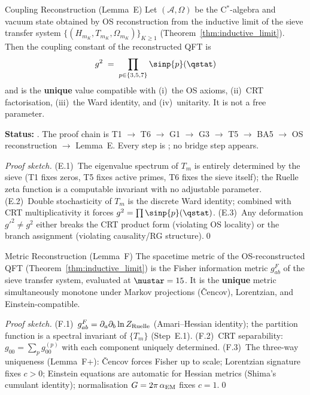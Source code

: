 \documentclass[12pt,a4paper]{article}
\begin{document}
\begin{thmbox}{Coupling Reconstruction (Lemma~E)}\mTHM
\label{thm:coupling_reconstruction}
Let $(\mathcal{A}, \Omega)$ be the C$^*$-algebra and vacuum state
obtained by OS reconstruction from the inductive limit of the sieve
transfer system $\{(H_{m_K}, T_{m_K}, \Omega_{m_K})\}_{K \geq 1}$
(Theorem~\ref{thm:inductive_limit}).  Then the coupling constant
of the reconstructed QFT is
\begin{equation}
  g^2 \;=\; \prod_{p \in \{3,5,7\}} \sinp{p}(\qstat)
  \label{eq:coupling_spectral}
\end{equation}
and is the \textbf{unique} value compatible with (i)~the OS axioms,
(ii)~CRT factorisation, (iii)~the Ward identity, and (iv)~unitarity.
It is not a free parameter.

\smallskip\noindent\textbf{Status:} \THMTAG.  The proof chain is
T1 $\to$ T6 $\to$ G1 $\to$ G3 $\to$ T5 $\to$ BA5 $\to$
OS reconstruction $\to$ Lemma~E.
Every step is \THMTAG; no bridge step appears.
\end{thmbox}

\noindent\textit{Proof sketch.}
(E.1)~The eigenvalue spectrum of $T_m$ is entirely determined by the
sieve (T1 fixes zeros, T5 fixes active primes, T6 fixes the sieve
itself); the Ruelle zeta function is a computable invariant with no
adjustable parameter.
(E.2)~Double stochasticity of $T_m$ is the discrete Ward identity;
combined with CRT multiplicativity it forces
$g^2 = \prod \sinp{p}(\qstat)$.
(E.3)~Any deformation $g'^2 \neq g^2$ either breaks the CRT product
form (violating OS locality) or the branch assignment (violating
causality/RG structure).\qed

\begin{thmbox}{Metric Reconstruction (Lemma~F)}\mTHM
\label{thm:metric_reconstruction}
The spacetime metric of the OS-reconstructed QFT
(Theorem~\ref{thm:inductive_limit}) is the Fisher information metric
$g^F_{ab}$ of the sieve transfer system, evaluated at $\mustar = 15$.
It is the \textbf{unique} metric simultaneously monotone under Markov
projections (\v{C}encov), Lorentzian, and Einstein-compatible.
\end{thmbox}

\noindent\textit{Proof sketch.}
(F.1)~$g^F_{ab} = \partial_a\partial_b \ln Z_{\rm Ruelle}$
(Amari--Hessian identity); the partition function is a spectral
invariant of $\{T_m\}$ (Step~E.1).
(F.2)~CRT separability:
$g_{00} = \sum_p g_{00}^{(p)}$ with each component uniquely determined.
(F.3)~The three-way uniqueness (Lemma~F+): \v{C}encov forces Fisher
up to scale; Lorentzian signature fixes $c > 0$; Einstein equations
are automatic for Hessian metrics (Shima's cumulant identity);
normalisation $G = 2\pi\,\alpha_{\rm EM}$ fixes $c = 1$.\qed
\end{document}
